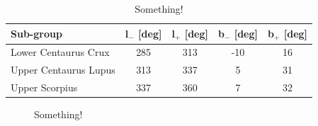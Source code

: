 \begin{table}[]
\centering
\caption{\scriptsize{Something!}}
\label{tab:ScoCen_SpatialDist}
\begin{tabular}{lcccc}
\hline
Sub-group             & l$_{-}$ {[}deg{]} & l$_{+}$ {[}deg{]} & b$_{-}$ {[}deg{]} & b$_{+}$ {[}deg{]} \\ \hline \hline
Lower Centaurus Crux  & 285               & 313               & -10               & 16                \\
Upper Centaurus Lupus & 313               & 337               & 5                 & 31                \\
Upper Scorpius        & 337               & 360               & 7                 & 32                \\ \hline \hline
\end{tabular}
\end{table}

\begin{figure}[!ht]%
    \centering
    \qquad
    \qquad
    \caption{\scriptsize{Something!}}%
    \label{fig:Hist_ScoCen_Mamajek}%
\end{figure}  

